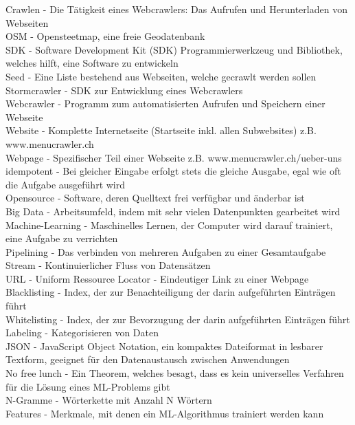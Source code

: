 Crawlen - Die Tätigkeit eines Webcrawlers: Das Aufrufen und Herunterladen von Webseiten\\
OSM - Opensteetmap, eine freie Geodatenbank\\
SDK - Software Development Kit (SDK) Programmierwerkzeug und Bibliothek, welches hilft, eine Software zu entwickeln\\
Seed - Eine Liste bestehend aus Webseiten, welche gecrawlt werden sollen\\
Stormcrawler - SDK zur Entwicklung eines Webcrawlers\\
Webcrawler - Programm zum automatisierten Aufrufen und Speichern einer Webseite\\
Website - Komplette Internetseite (Startseite inkl. allen Subwebsites) z.B. www.menucrawler.ch\\
Webpage - Spezifischer Teil einer Webseite z.B. www.menucrawler.ch/ueber-uns\\
idempotent - Bei gleicher Eingabe erfolgt stets die gleiche Ausgabe, egal wie oft die Aufgabe ausgeführt wird\\
Opensource - Software, deren Quelltext frei verfügbar und änderbar ist\\
Big Data - Arbeitsumfeld, indem mit sehr vielen Datenpunkten gearbeitet wird\\
Machine-Learning - Maschinelles Lernen, der Computer wird darauf trainiert, eine Aufgabe zu verrichten\\
Pipelining - Das verbinden von mehreren Aufgaben zu einer Gesamtaufgabe\\
Stream - Kontinuierlicher Fluss von Datensätzen\\
URL - Uniform Ressource Locator - Eindeutiger Link zu einer Webpage\\
Blacklisting - Index, der zur Benachteiligung der darin aufgeführten Einträgen führt\\
Whitelisting - Index, der zur Bevorzugung der darin aufgeführten Einträgen führt\\
Labeling - Kategorisieren von Daten\\
JSON - JavaScript Object Notation, ein kompaktes Dateiformat in lesbarer Textform, geeignet für den Datenaustausch zwischen Anwendungen\\
No free lunch - Ein Theorem, welches besagt, dass es kein universelles Verfahren für die Lösung eines ML-Problems gibt\\
N-Gramme - Wörterkette mit Anzahl N Wörtern\\
Features - Merkmale, mit denen ein ML-Algorithmus trainiert werden kann\\
